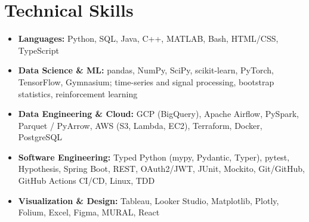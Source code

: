 \documentclass[10pt,letterpaper]{article}
\begin{document}
\section*{Technical Skills}
\begin{itemize}\item \textbf{Languages:} Python, SQL, Java, C++, MATLAB, Bash, HTML/CSS, TypeScript\item \textbf{Data Science \& ML:} pandas, NumPy, SciPy, scikit-learn, PyTorch, TensorFlow, Gymnasium; time-series and signal processing, bootstrap statistics, reinforcement learning\item \textbf{Data Engineering \& Cloud:} GCP (BigQuery), Apache Airflow, PySpark, Parquet / PyArrow, AWS (S3, Lambda, EC2), Terraform, Docker, PostgreSQL\item \textbf{Software Engineering:} Typed Python (mypy, Pydantic, Typer), pytest, Hypothesis, Spring Boot, REST, OAuth2/JWT, JUnit, Mockito, Git/GitHub, GitHub Actions CI/CD, Linux, TDD\item \textbf{Visualization \& Design:} Tableau, Looker Studio, Matplotlib, Plotly, Folium, Excel, Figma, MURAL, React\end{itemize}
\end{document}
